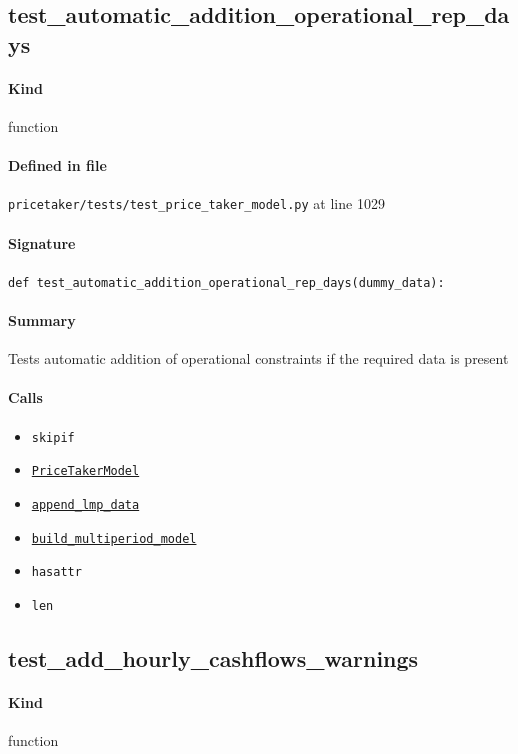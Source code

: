 \documentclass[11pt]{report}
\begin{document}
\subsection{test\_automatic\_addition\_operational\_rep\_days}
\label{def:pricetaker-tests-test_price_taker_model.py:test_automatic_addition_operational_rep_days:L1029}
\paragraph{Kind} function
\paragraph{Defined in file} \texttt{pricetaker/tests/test\_price\_taker\_model.py} at line 1029
\paragraph{Signature} \texttt{def test\_automatic\_addition\_operational\_rep\_days(dummy\_data):}
\paragraph{Summary} Tests automatic addition of operational constraints if the required data is present
\paragraph{Calls}
\begin{itemize}[leftmargin=*]
  \item \texttt{skipif}
  \item \hyperref[def:pricetaker-price_taker_model.py:PriceTakerModel:L161]{\texttt{PriceTakerModel}}
  \item \hyperref[def:pricetaker-price_taker_model.py:PriceTakerModel.append_lmp_data:L221]{\texttt{append\_lmp\_data}}
  \item \hyperref[def:pricetaker-price_taker_model.py:PriceTakerModel.build_multiperiod_model:L291]{\texttt{build\_multiperiod\_model}}
  \item \texttt{hasattr}
  \item \texttt{len}
\end{itemize}
\subsection{test\_add\_hourly\_cashflows\_warnings}
\label{def:pricetaker-tests-test_price_taker_model.py:test_add_hourly_cashflows_warnings:L1051}
\paragraph{Kind} function
\end{document}
